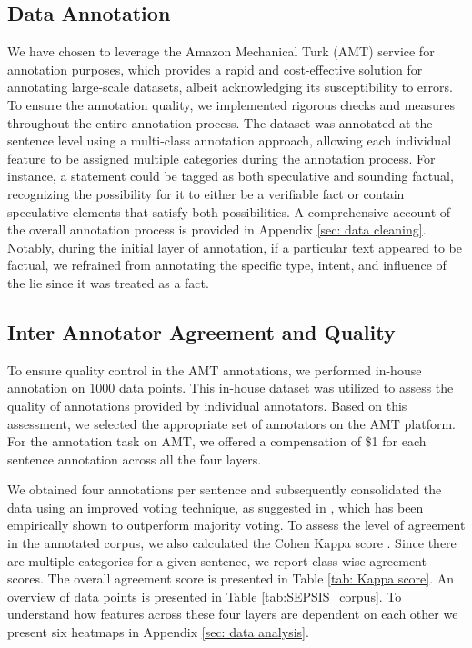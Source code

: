 \subsection{Data Annotation}
\vspace{-1mm}  
We have chosen to leverage the Amazon Mechanical Turk (AMT) service for annotation purposes, which provides a rapid and cost-effective solution for annotating large-scale datasets, albeit acknowledging its susceptibility to errors. To ensure the annotation quality, we implemented rigorous checks and measures throughout the entire annotation process. The dataset was annotated at the sentence level using a multi-class annotation approach, allowing each individual feature to be assigned multiple categories during the annotation process. For instance, a statement could be tagged as both speculative and sounding factual, recognizing the possibility for it to either be a verifiable fact or contain speculative elements that satisfy both possibilities. A comprehensive account of the overall annotation process is provided in Appendix \ref{sec: data cleaning}. Notably, during the initial layer of annotation, if a particular text appeared to be factual, we refrained from annotating the specific type, intent, and influence of the lie since it was treated as a fact.

\subsection{Inter Annotator Agreement and Quality}
\label{sec:iaa_score}
To ensure quality control in the AMT annotations, we performed in-house annotation on 1000 data points. This in-house dataset was utilized to assess the quality of annotations provided by individual annotators. Based on this assessment, we selected the appropriate set of annotators on the AMT platform. For the annotation task on AMT, we offered a compensation of \$1 for each sentence annotation across all the four layers.

We obtained four annotations per sentence and subsequently consolidated the data using an improved voting technique, as suggested in \cite{hovy-etal-2013-learning}, which has been empirically shown to outperform majority voting. To assess the level of agreement in the annotated corpus, we also calculated the Cohen Kappa score \cite{cohen1960coefficient}. Since there are multiple categories for a given sentence, we report class-wise agreement scores. The overall agreement score is presented in Table \ref{tab: Kappa score}. An overview of data points is presented in Table \ref{tab:SEPSIS_corpus}. To understand how features across these four layers are dependent on each other we present six heatmaps in Appendix \ref{sec: data analysis}.



